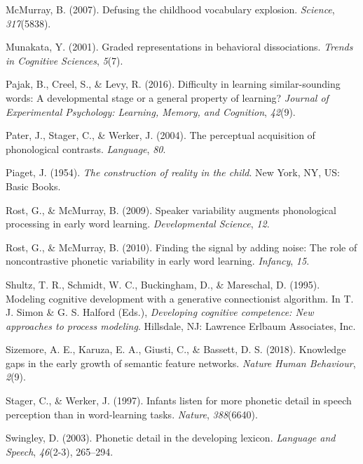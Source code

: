 \documentclass[english,,man]{apa6}
\begin{document}
\leavevmode\hypertarget{ref-McMurray2007}{}%
McMurray, B. (2007). Defusing the childhood vocabulary explosion. \emph{Science}, \emph{317}(5838).

\leavevmode\hypertarget{ref-Munakata2001}{}%
Munakata, Y. (2001). Graded representations in behavioral dissociations. \emph{Trends in Cognitive Sciences}, \emph{5}(7).

\leavevmode\hypertarget{ref-pajak2016}{}%
Pajak, B., Creel, S., \& Levy, R. (2016). Difficulty in learning similar-sounding words: A developmental stage or a general property of learning? \emph{Journal of Experimental Psychology: Learning, Memory, and Cognition}, \emph{42}(9).

\leavevmode\hypertarget{ref-pater2004}{}%
Pater, J., Stager, C., \& Werker, J. (2004). The perceptual acquisition of phonological contrasts. \emph{Language}, \emph{80}.

\leavevmode\hypertarget{ref-piaget1954}{}%
Piaget, J. (1954). \emph{The construction of reality in the child}. New York, NY, US: Basic Books.

\leavevmode\hypertarget{ref-rost2009}{}%
Rost, G., \& McMurray, B. (2009). Speaker variability augments phonological processing in early word learning. \emph{Developmental Science}, \emph{12}.

\leavevmode\hypertarget{ref-rost2010}{}%
Rost, G., \& McMurray, B. (2010). Finding the signal by adding noise: The role of noncontrastive phonetic variability in early word learning. \emph{Infancy}, \emph{15}.

\leavevmode\hypertarget{ref-shultz1995}{}%
Shultz, T. R., Schmidt, W. C., Buckingham, D., \& Mareschal, D. (1995). Modeling cognitive development with a generative connectionist algorithm. In T. J. Simon \& G. S. Halford (Eds.), \emph{Developing cognitive competence: New approaches to process modeling}. Hillsdale, NJ: Lawrence Erlbaum Associates, Inc.

\leavevmode\hypertarget{ref-sizemore2018}{}%
Sizemore, A. E., Karuza, E. A., Giusti, C., \& Bassett, D. S. (2018). Knowledge gaps in the early growth of semantic feature networks. \emph{Nature Human Behaviour}, \emph{2}(9).

\leavevmode\hypertarget{ref-stager1997}{}%
Stager, C., \& Werker, J. (1997). Infants listen for more phonetic detail in speech perception than in word-learning tasks. \emph{Nature}, \emph{388}(6640).

\leavevmode\hypertarget{ref-swingley2003}{}%
Swingley, D. (2003). Phonetic detail in the developing lexicon. \emph{Language and Speech}, \emph{46}(2-3), 265--294.
\end{document}
